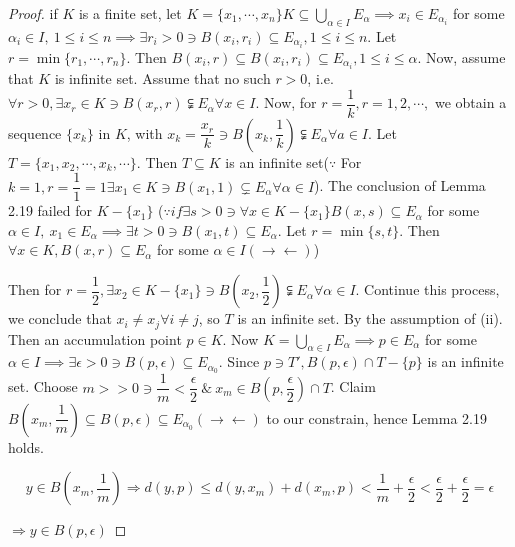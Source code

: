 \begin{proof}
	if $K$ is a finite set, let $K = \{x_1,\cdots,x_n\} K \subseteq \bigcup_{\alpha \in I}E_{\alpha} \implies x_i \in E_{\alpha_i}$ for some $\alpha_i \in I,~ 1 \leq i \leq n \implies \exists r_i > 0 \ni B(x_i,r_i) \subseteq E_{\alpha_i},1\leq i \leq n$. Let $r = \min \{r_1,\cdots,r_n\}$. Then $B(x_i,r) \subseteq B(x_i,r_i) \subseteq E_{\alpha_i},1\leq i \leq \alpha$. Now, assume that $K$ is infinite set. Assume that no such $r > 0$, i.e. $\forall r > 0, \exists x_r \in K \ni B(x_r,r) \subsetneqq E_{\alpha} \forall x \in I$. Now, for $r = \dfrac{1}{k},r=1,2,\cdots,$ we obtain a sequence $\{x_k\}$ in $K$, with $x_k = \dfrac{x_r}{k} \ni B(x_k,\dfrac{1}{k}) \subsetneqq E_{\alpha} \forall a \in I$. Let $T = \{x_1,x_2,\cdots,x_k,\cdots\}$. Then $T \subseteq K$ is an infinite set($\because$ For $k = 1,r=\dfrac{1}{1} = 1 \exists x_1 \in K \ni B(x_1,1) \subsetneq E_{\alpha} \forall \alpha \in I$). The conclusion of Lemma 2.19 failed for $K - \{x_1\}$ ($\because if \exists s> 0 \ni \forall x \in K-\{x_1\} B(x,s) \subseteq E_{\alpha}$ for some $\alpha \in I,~ x_1 \in E_{\alpha} \implies \exists t > 0 \ni B(x_1,t) \subseteq E_{\alpha}$. Let $r = \min \{s,t\}$. Then $\forall x \in K, B(x,r) \subseteq E_{\alpha}$ for some $\alpha \in I (\rightarrow \leftarrow)$)
	
	Then for $r = \dfrac{1}{2}, \exists x_2 \in K - \{ x_1\} \ni B(x_2,\dfrac{1}{2}) \subsetneqq E_{\alpha} \forall \alpha \in I$. Continue this process, we conclude that $x_i \neq x_j \forall i \neq j$, so $T$ is an infinite set. By the assumption of (ii). Then an accumulation point $p \in K$. Now $K = \bigcup_{\alpha \in I}E_{\alpha} \implies p \in E_{\alpha}$ for some $\alpha \in I \implies \exists \epsilon > 0 \ni B(p, \epsilon) \subseteq E_{\alpha_0}$. Since $p \ni T',B(p,\epsilon) \cap T - \{p\}$ is an infinite set. Choose $m >> 0 \ni \dfrac{1}{m} < \dfrac{\epsilon}{2} ~\&~ x_m \in B(p,\dfrac{\epsilon}{2}) \cap T$. Claim $B(x_m , \dfrac{1}{m}) \subseteq B(p,\epsilon) \subseteq E_{\alpha_0} (\rightarrow\leftarrow)$ to our constrain, hence Lemma 2.19 holds.
	
	$$y \in B(x_m,\dfrac{1}{m}) \Rightarrow d(y,p) \leq d(y,x_m) + d(x_m,p) < \dfrac{1}{m} + \dfrac{\epsilon}{2} < \dfrac{\epsilon}{2} + \dfrac{\epsilon}{2} = \epsilon $$
	
	$\Rightarrow y \in B(p,\epsilon)$
\end{proof}


